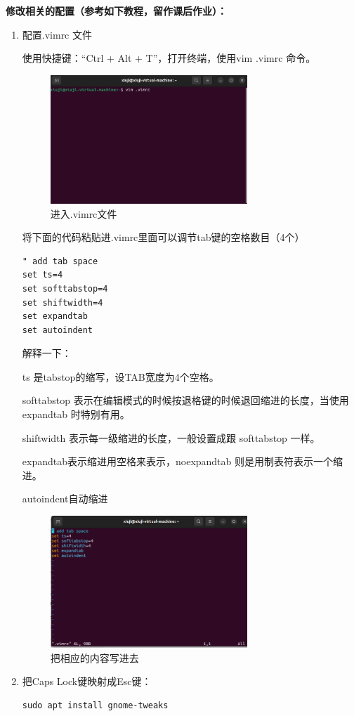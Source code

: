 \documentclass[12pt]{article}
\begin{document}
\noindent \textbf{修改相关的配置（参考如下教程，留作课后作业）：}
\begin{enumerate}
    \item 配置.vimrc 文件

使用快捷键：“Ctrl + Alt + T”，打开终端，使用vim .vimrc 命令。

\begin{figure}[h]
    \centering
    \includegraphics[width=0.7\textwidth]{img/.vimrc.png}
    \caption{进入.vimrc文件}
\end{figure}

将下面的代码粘贴进.vimrc里面可以调节tab键的空格数目（4个）

\begin{verbatim}
" add tab space
set ts=4
set softtabstop=4
set shiftwidth=4
set expandtab
set autoindent
\end{verbatim}

解释一下：

ts 是tabstop的缩写，设TAB宽度为4个空格。

softtabstop 表示在编辑模式的时候按退格键的时候退回缩进的长度，当使用 expandtab 时特别有用。

shiftwidth 表示每一级缩进的长度，一般设置成跟 softtabstop 一样。

expandtab表示缩进用空格来表示，noexpandtab 则是用制表符表示一个缩进。

autoindent自动缩进    

\begin{figure}[h]
    \centering
    \includegraphics[width=0.7\textwidth]{img/fixvim.png}
    \caption{把相应的内容写进去}
\end{figure}
\newpage
\item 把Caps Lock键映射成Esc键：
\begin{verbatim}
sudo apt install gnome-tweaks


\end{verbatim}
\end{enumerate}
\end{document}
